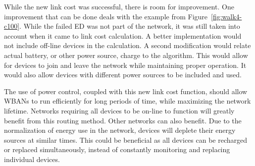 \documentclass{article}
\begin{document}
While the new link cost was successful, there is room for improvement. One improvement that can be done deals with the example from Figure~\ref{fig:walk4-c100}. While the failed ED was not part of the network, it was still taken into account when it came to link cost calculation. A better implementation would not include off-line devices in the calculation. A second modification would relate actual battery, or other power source, charge to the algorithm. This would allow for devices to join and leave the network while maintaining proper operation. It would also allow devices with different power sources to be included and used.

The use of power control, coupled with this new link cost function, should allow WBANs to run efficiently for long periods of time, while maximizing the network lifetime. Networks requiring all devices to be on-line to function will greatly benefit from this routing method. Other networks can also benefit. Due to the normalization of energy use in the network, devices will deplete their energy sources at similar times. This could be beneficial as all devices can be recharged or replaced simultaneously, instead of constantly monitoring and replacing individual devices.

{}

\end{document}
